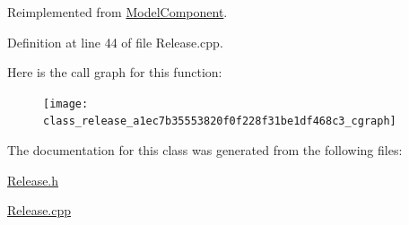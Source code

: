Reimplemented from \hyperlink{class_model_component_ad8bc846e36b028eab7efb7da6c549eca}{Model\-Component}.



Definition at line 44 of file Release.\-cpp.



Here is the call graph for this function\-:\nopagebreak
\begin{figure}[H]
\begin{center}
\leavevmode
\texttt{[image: class\_release\_a1ec7b35553820f0f228f31be1df468c3\_cgraph]}
\end{center}
\end{figure}




The documentation for this class was generated from the following files\-:\begin{DoxyCompactItemize}
\item 
\hyperlink{_release_8h}{Release.\-h}\item 
\hyperlink{_release_8cpp}{Release.\-cpp}\end{DoxyCompactItemize}
